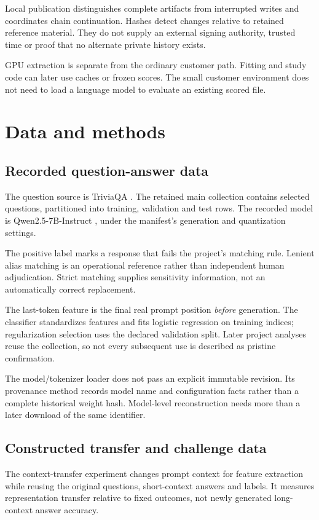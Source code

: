 Local publication distinguishes complete artifacts from interrupted writes and
coordinates chain continuation. Hashes detect changes relative to retained
reference material. They do not supply an external signing authority, trusted
time or proof that no alternate private history exists.

GPU extraction is separate from the ordinary customer path. Fitting and study
code can later use caches or frozen scores. The small customer environment does
not need to load a language model to evaluate an existing scored file.

\section{Data and methods}
\subsection{Recorded question-answer data}
The question source is TriviaQA \citep{joshi2017}. The retained main collection
contains \CorpusRows{} selected questions, partitioned into \TrainRows{}
training, \ValidationRows{} validation and \TestRows{} test rows. The recorded
model is Qwen2.5-7B-Instruct \citep{qwenmodel}, under the manifest's generation
and quantization settings.

The positive label marks a response that fails the project's matching rule.
Lenient alias matching is an operational reference rather than independent
human adjudication. Strict matching supplies sensitivity information, not an
automatically correct replacement.

The last-token feature is the final real prompt position \emph{before}
generation. The classifier standardizes features and fits logistic regression on
training indices; regularization selection uses the declared validation split.
Later project analyses reuse the collection, so not every subsequent use is
described as pristine confirmation.

The model/tokenizer loader does not pass an explicit immutable revision.
Its provenance method records model name and configuration facts rather than a
complete historical weight hash. Model-level reconstruction needs more than a
later download of the same identifier.

\subsection{Constructed transfer and challenge data}
The context-transfer experiment changes prompt context for feature extraction
while reusing the original questions, short-context answers and labels. It
measures representation transfer relative to fixed outcomes, not newly generated
long-context answer accuracy.

